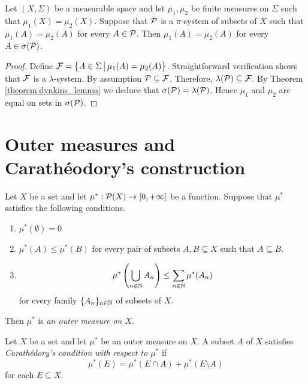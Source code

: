 \begin{theorem}\label{theorem:uniqueness_on_pi_system}
Let $(X,\Sigma)$ be a measurable space and let $\mu_1,\mu_2$ be finite measures on $\Sigma$ such that $\mu_1(X)=\mu_2(X)$. Suppose that ${\mathcal P}$ is a $\pi$-system of subsets of $X$ such that $\mu_1(A)=\mu_2(A)$ for every $A\in {\mathcal P}$. Then $\mu_1(A) = \mu_2(A)$ for every $A\in \sigma({\mathcal P})$.
\end{theorem}
\begin{proof}
Define ${\mathcal F} = \big\{A\in \Sigma\,\big|\,\mu_1(A)=\mu_2(A) \big\}$. Straightforward verification shows that ${\mathcal F}$ is a $\lambda$-system. By assumption ${\mathcal P} \subseteq {\mathcal F}$. Therefore, $\lambda({\mathcal P}) \subseteq {\mathcal F}$. By Theorem \ref{theorem:dynkins_lemma} we deduce that $\sigma({\mathcal P})=\lambda({\mathcal P})$. Hence $\mu_1$ and $\mu_2$ are equal on sets in $\sigma({\mathcal P})$.
\end{proof}



\section{Outer measures and Carath{\'e}odory's construction}

\begin{definition}
Let $X$ be a set and let $\mu^*:{\mathcal P}(X)\rightarrow [0,+\infty]$ be a function. Suppose that $\mu^*$ satisfies the following conditions.
\begin{enumerate}[label=\textbf{(\arabic*)}, leftmargin=*]
\item $\mu^*(\emptyset) = 0$
\item $\mu^*(A) \leq \mu^*(B)$ for every pair of subsets $A,B\subseteq X$ such that $A\subseteq B$.
\item $$\mu^*\left( \bigcup_{n\in {\mathbb N}}A_n \right)\leq \sum_{n\in {\mathbb N}}\mu^*(A_n)$$ 
for every family  $\{A_n\}_{n\in {\mathbb N}}$ of subsets of $X$.
\end{enumerate}
Then $\mu^*$ is \textit{an outer measure on $X$}.
\end{definition}

\begin{definition}
Let $X$ be a set and let $\mu^*$ be an outer measure on $X$. A subset $A$ of $X$ satisfies \textit{Carath{\'e}dory's condition with respect to $\mu^*$} if 
$$\mu^*(E)=\mu^*(E\cap A)+\mu^*(E\setminus A)$$
for each $E\subseteq X$.
\end{definition}

